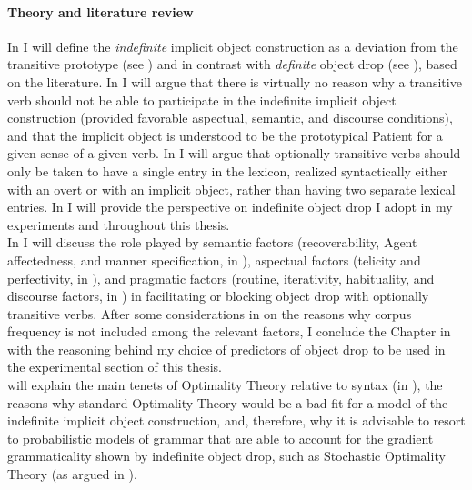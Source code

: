 \paragraph{Theory and literature review}
In  I will define the \textit{indefinite} implicit object construction as a deviation from the transitive prototype (see ) and in contrast with \textit{definite} object drop (see ), based on the literature. In  I will argue that there is virtually no reason why a transitive verb should not be able to participate in the indefinite implicit object construction (provided favorable aspectual, semantic, and discourse conditions), and that the implicit object is understood to be the prototypical Patient for a given sense of a given verb. In  I will argue that optionally transitive verbs should only be taken to have a single entry in the lexicon, realized syntactically either with an overt or with an implicit object, rather than having two separate lexical entries. In  I will provide the perspective on indefinite object drop I adopt in my experiments and throughout this thesis.\\
In  I will discuss the role played by semantic factors (recoverability, Agent affectedness, and manner specification, in ), aspectual factors (telicity and perfectivity, in ), and pragmatic factors (routine, iterativity, habituality, and discourse factors, in ) in facilitating or blocking object drop with optionally transitive verbs. After some considerations in  on the reasons why corpus frequency is not included among the relevant factors, I conclude the Chapter in  with the reasoning behind my choice of predictors of object drop to be used in the experimental section of this thesis.\\
 will explain the main tenets of Optimality Theory relative to syntax (in ), the reasons why standard Optimality Theory would be a bad fit for a model of the indefinite implicit object construction, and, therefore, why it is advisable to resort to probabilistic models of grammar that are able to account for the gradient grammaticality shown by indefinite object drop, such as Stochastic Optimality Theory (as argued in ).\\
